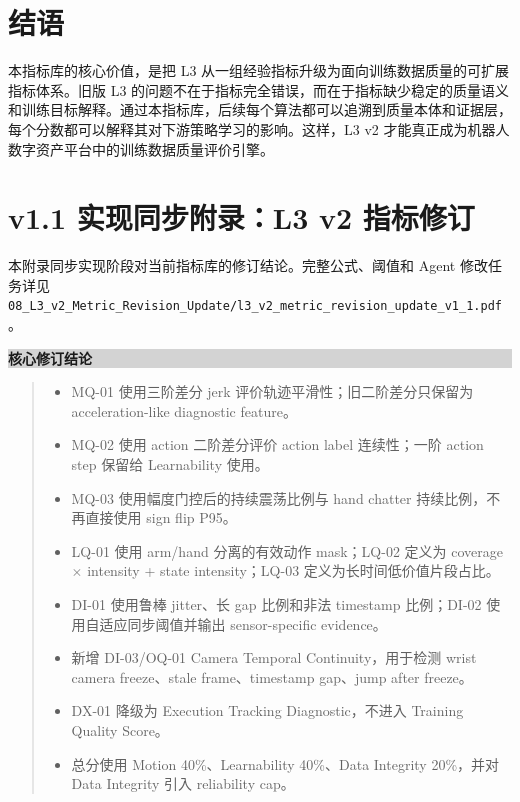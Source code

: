 \documentclass[UTF8,zihao=-4]{ctexart}
\newcommand{\Code}[1]{\texttt{#1}}
\newenvironment{decisionbox}[1]{\vspace{0.5em}\noindent\colorbox{LightGray}{\parbox{0.96\linewidth}{\textbf{#1}}}\par\vspace{-0.2em}\begin{quote}\small}{\end{quote}\vspace{0.3em}}
\begin{document}
\section*{结语}

本指标库的核心价值，是把 L3 从一组经验指标升级为面向训练数据质量的可扩展指标体系。旧版 L3 的问题不在于指标完全错误，而在于指标缺少稳定的质量语义和训练目标解释。通过本指标库，后续每个算法都可以追溯到质量本体和证据层，每个分数都可以解释其对下游策略学习的影响。这样，L3 v2 才能真正成为机器人数字资产平台中的训练数据质量评价引擎。


\newpage
\section*{v1.1 实现同步附录：L3 v2 指标修订}

本附录同步实现阶段对当前指标库的修订结论。完整公式、阈值和 Agent 修改任务详见 \Code{08\_L3\_v2\_Metric\_Revision\_Update/l3\_v2\_metric\_revision\_update\_v1\_1.pdf}。

\begin{decisionbox}{核心修订结论}
\begin{itemize}
\item MQ-01 使用三阶差分 jerk 评价轨迹平滑性；旧二阶差分只保留为 acceleration-like diagnostic feature。
\item MQ-02 使用 action 二阶差分评价 action label 连续性；一阶 action step 保留给 Learnability 使用。
\item MQ-03 使用幅度门控后的持续震荡比例与 hand chatter 持续比例，不再直接使用 sign flip P95。
\item LQ-01 使用 arm/hand 分离的有效动作 mask；LQ-02 定义为 coverage \(\times\) intensity + state intensity；LQ-03 定义为长时间低价值片段占比。
\item DI-01 使用鲁棒 jitter、长 gap 比例和非法 timestamp 比例；DI-02 使用自适应同步阈值并输出 sensor-specific evidence。
\item 新增 DI-03/OQ-01 Camera Temporal Continuity，用于检测 wrist camera freeze、stale frame、timestamp gap、jump after freeze。
\item DX-01 降级为 Execution Tracking Diagnostic，不进入 Training Quality Score。
\item 总分使用 Motion 40\%、Learnability 40\%、Data Integrity 20\%，并对 Data Integrity 引入 reliability cap。
\end{itemize}
\end{decisionbox}
\end{document}
